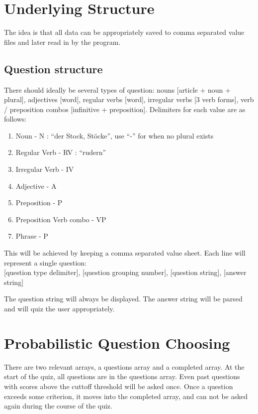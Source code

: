 \documentclass[11pt]{article}
\begin{document}
\section{Underlying Structure}
The idea is that all data can be appropriately saved to comma separated value files 
and later read in by the program.

\subsection{Question structure}
There should ideally be several types of question: nouns [article + noun + plural], adjectives [word], regular verbs [word], irregular verbs [3 verb forms], verb / preposition combos [infinitive + preposition]. Delimiters for each value are as follows:

\begin{enumerate}
\item Noun - N : ``der Stock, St{\"o}cke'', use ``-'' for when no plural exists
\item Regular Verb - RV : ``rudern''
\item Irregular Verb - IV
\item Adjective - A
\item Preposition - P
\item Preposition Verb combo - VP
\item Phrase - P
\end{enumerate}

This will be achieved by keeping a comma separated value sheet. Each line will represent a single question: \\

[question type delimiter], [question grouping number], [question string], [answer string] \*

The question string will always be displayed. The answer string will be parsed and will quiz the user appropriately.

\section{Probabilistic Question Choosing}

There are two relevant arrays, a questions array and a completed array. At the start of the quiz, all questions are in the questions array. Even past questions with scores above the cuttoff threshold will be asked once. Once a question exceeds some criterion, it moves into the completed array, and can not be asked again during the course of the quiz. \\
\end{document}
